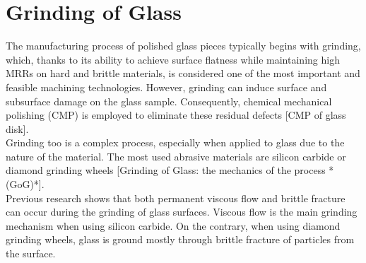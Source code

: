 \label{ch:experimental_techniques}

\section{Grinding of Glass}
\label{sec:grinding_glass}

The manufacturing process of polished glass pieces typically begins with grinding, which, thanks to its ability to achieve surface flatness while maintaining high MRRs on hard and brittle materials, is considered one of the most important and feasible machining technologies. However, grinding can induce surface and subsurface damage on the glass sample. Consequently, chemical mechanical polishing (CMP) is employed to eliminate these residual defects [CMP of glass disk].
\\
Grinding too is a complex process, especially when applied to glass due to the nature of the material. The most used abrasive materials are silicon carbide or diamond grinding wheels [Grinding of Glass: the mechanics of the process *(GoG)*]. 
\\
Previous research shows that both permanent viscous flow and brittle fracture can occur during the grinding of glass surfaces. 
Viscous flow is the main grinding mechanism when using silicon carbide. On the contrary, when using diamond grinding wheels, glass is ground mostly through brittle fracture of particles from the surface.

